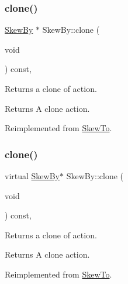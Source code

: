 \subsubsection{\texorpdfstring{clone()}{clone()}\hspace{0.1cm}{\footnotesize\ttfamily [1/2]}}
{\footnotesize\ttfamily \hyperlink{classSkewBy}{Skew\+By} $\ast$ Skew\+By\+::clone (\begin{DoxyParamCaption}\item[{void}]{ }\end{DoxyParamCaption}) const\hspace{0.3cm}{\ttfamily [override]}, {\ttfamily [virtual]}}

Returns a clone of action.

\begin{DoxyReturn}{Returns}
A clone action. 
\end{DoxyReturn}


Reimplemented from \hyperlink{classSkewTo_a9d7fb4b11a50457b43453cfdd5753231}{Skew\+To}.

\mbox{\label{classSkewBy_a44399096122f1351b972ee260c667ea0}} 
\subsubsection{\texorpdfstring{clone()}{clone()}\hspace{0.1cm}{\footnotesize\ttfamily [2/2]}}
{\footnotesize\ttfamily virtual \hyperlink{classSkewBy}{Skew\+By}$\ast$ Skew\+By\+::clone (\begin{DoxyParamCaption}\item[{void}]{ }\end{DoxyParamCaption}) const\hspace{0.3cm}{\ttfamily [override]}, {\ttfamily [virtual]}}

Returns a clone of action.

\begin{DoxyReturn}{Returns}
A clone action. 
\end{DoxyReturn}


Reimplemented from \hyperlink{classSkewTo_a9d7fb4b11a50457b43453cfdd5753231}{Skew\+To}.

\mbox{\label{classSkewBy_a184b1383d0366ae24f5afa4602691d1e}} 
